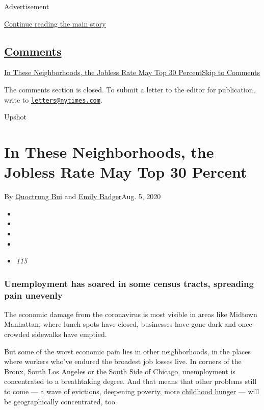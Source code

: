 Advertisement

\protect\hyperlink{after-top}{Continue reading the main story}

\hypertarget{comments}{%
\subsection{\texorpdfstring{\protect\hyperlink{commentsContainer}{Comments}}{Comments}}\label{comments}}

\href{}{In These Neighborhoods, the Jobless Rate May Top 30
Percent}\href{}{Skip to Comments}

The comments section is closed. To submit a letter to the editor for
publication, write to
\href{mailto:letters@nytimes.com}{\nolinkurl{letters@nytimes.com}}.

Upshot

\hypertarget{in-these-neighborhoods-the-jobless-rate-may-top-30-percent}{%
\section{In These Neighborhoods, the Jobless Rate May Top 30
Percent}\label{in-these-neighborhoods-the-jobless-rate-may-top-30-percent}}

By \href{https://www.nytimes.com/by/quoctrung-bui}{Quoctrung Bui} and
\href{https://www.nytimes.com/by/emily-badger}{Emily Badger}Aug. 5, 2020

\begin{itemize}
\item
\item
\item
\item
\item
  \emph{115}
\end{itemize}

\hypertarget{unemployment-has-soared-in-some-census-tracts-spreading-pain-unevenly}{%
\subsubsection{Unemployment has soared in some census tracts, spreading
pain
unevenly}\label{unemployment-has-soared-in-some-census-tracts-spreading-pain-unevenly}}

The economic damage from the coronavirus is most visible in areas like
Midtown Manhattan, where lunch spots have closed, businesses have gone
dark and once-crowded sidewalks have emptied.

But some of the worst economic pain lies in other neighborhoods, in the
places where workers who've endured the broadest job losses live. In
corners of the Bronx, South Los Angeles or the South Side of Chicago,
unemployment is concentrated to a breathtaking degree. And that means
that other problems still to come --- a wave of evictions, deepening
poverty, more \href{https://t.co/EbkPprWGbz?amp=1}{childhood hunger} ---
will be geographically concentrated, too.

